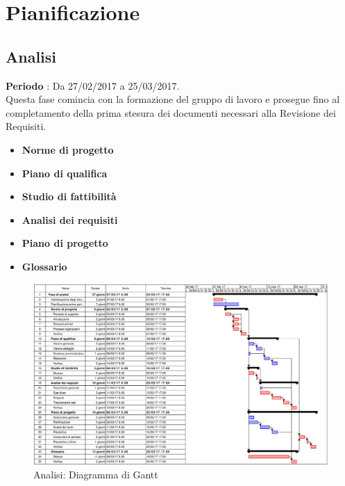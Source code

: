 \documentclass[../PianoDiProgetto.tex]{subfiles}
\begin{document}
	\section{Pianificazione}
	
		\subsection{Analisi}
		\textbf{Periodo} : Da 27/02/2017 a 25/03/2017. \\
		Questa fase comincia con la formazione del gruppo di lavoro e prosegue fino al completamento della prima stesura dei documenti necessari alla Revisione dei Requisiti.
		\begin{itemize}
			\item \textbf{Norme di progetto}
			\item \textbf{Piano di qualifica}
			\item \textbf{Studio di fattibilità}
			\item \textbf{Analisi dei requisiti}
			\item \textbf{Piano di progetto}
			\item \textbf{Glossario}
		\end{itemize}
		\begin{figure}[H]
			\centering
			\includegraphics[scale=0.55]{Figures/Gantt_Analisi.jpg}
			\caption{Analisi: Diagramma di Gantt}
		\end{figure}
			
			
			
\end{document}
